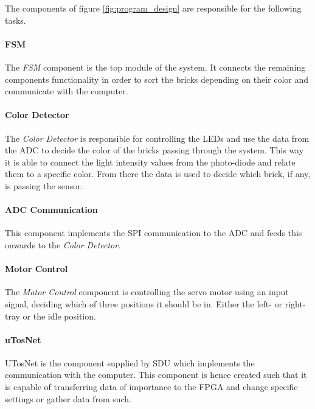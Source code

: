 The components of figure \ref{fig:program_design} are responsible for the following tasks.

\paragraph*{FSM}
The \textit{FSM} component is the top module of the system.
It connects the remaining components functionality in order to sort the bricks depending on their color and communicate with the computer.

\paragraph*{Color Detector}
The \textit{Color Detector} is responsible for controlling the LEDs and use the data from the ADC to decide the color of the bricks passing through the system.
This way it is able to connect the light intensity values from the photo-diode and relate them to a specific color.
From there the data is used to decide which brick, if any, is passing the sensor.

\paragraph*{ADC Communication}
This component implements the SPI communication to the ADC and feeds this onwards to the \textit{Color Detector}.


\paragraph*{Motor Control}
The \textit{Motor Control} component is controlling the servo motor using an input signal, deciding which of three positions it should be in.
Either the left- or right-tray or the idle position.

\paragraph*{uTosNet}
UTosNet is the component supplied by SDU which implements the communication with the computer.
This component is hence created such that it is capable of transferring data of importance to the FPGA and change specific settings or gather data from such.



